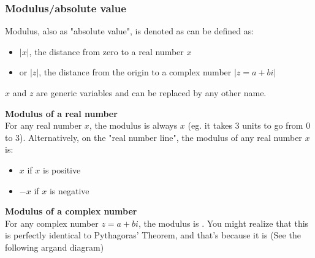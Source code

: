 \documentclass{article}
\begin{document}
\begin{center}
\end{center}

\subsubsection{Modulus/absolute value}
Modulus, also as "absolute value", is denoted as can be defined as:
\begin{itemize}
    \item $|x|$, the distance from zero to a real number $x$
    \item or $|z|$, the distance from the origin to a complex number $|z=a+bi|$
\end{itemize}

\noindent$x$ and $z$ are generic variables and can be replaced by any other name.

\vspace{\baselineskip}

\noindent\textbf{Modulus of a real number} \\
For any real number $x$, the modulus is always $x$ (eg. it takes 3 units to go from 0 to 3). Alternatively, on the "real number line", the modulus of any real number $x$ is:
\begin{itemize}
    \item $x$ if $x$ is positive
    \item $-x$ if $x$ is negative
\end{itemize}

\noindent\textbf{Modulus of a complex number} \\
For any complex number $z=a+bi$, the modulus is . You might realize that this is perfectly identical to Pythagoras' Theorem, and that's because it is (See the following argand diagram)
\end{document}
